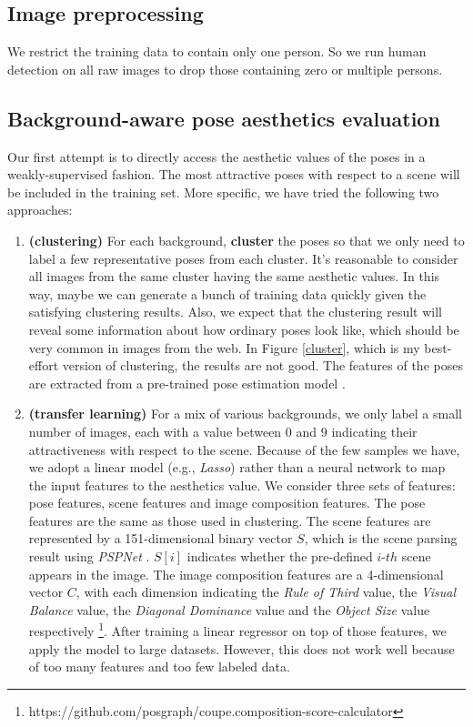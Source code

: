 \documentclass{article}
\begin{document}
\subsection{Image preprocessing}

We restrict the training data to contain only one person. So we run human detection on all raw images to drop those containing zero or multiple persons.

\subsection{Background-aware pose aesthetics evaluation}
    Our first attempt is to directly access the aesthetic values of the poses in a weakly-supervised fashion. The most attractive poses with respect to a scene will be included in the training set. More specific, we have tried the following two approaches:

    \begin{enumerate}
        \item \textbf{(clustering)} For each background, \textbf{cluster} the poses so that we only need to label a few representative poses from each cluster. It's reasonable to consider all images from the same cluster having the same aesthetic values. In this way, maybe we can generate a bunch of training data quickly given the satisfying clustering results. Also, we expect that the clustering result will reveal some information about how ordinary poses look like, which should be very common in images from the web. In Figure 
        \ref{cluster}, which is my best-effort version of clustering, the results are not good. The features of the poses are extracted from a pre-trained pose estimation model \cite{insafutdinov2017cvpr}.  
        \item \textbf{(transfer learning)} For a mix of various backgrounds, we only label a small number of images, each with a value between $0$ and $9$ indicating their attractiveness with respect to the scene. Because of the few samples we have, we adopt a linear model (e.g., \emph{Lasso}) rather than a neural network to map the input features to the aesthetics value. We consider three sets of features: pose features, scene features and image composition features. The pose features are the same as those used in clustering. The scene features are represented by a 151-dimensional binary vector $S$, which is the scene parsing result using \emph{PSPNet} \cite{zhao2017pspnet}. $S[i]$ indicates whether the pre-defined $i$-$th$ scene appears in the image. The image composition features are a 4-dimensional vector $C$, with each dimension indicating the \emph{Rule of Third} value, the \emph{Visual Balance} value, the \emph{Diagonal Dominance} value and the \emph{Object Size} value respectively \footnote{https://github.com/posgraph/coupe.composition-score-calculator}. After training a linear regressor on top of those features, we apply the model to large datasets. However, this does not work well because of too many features and too few labeled data.
    \end{enumerate}
 
\end{document}
